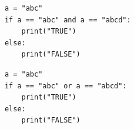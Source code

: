 \documentclass[dvipsnames, svgnames, x11names, handout]{beamer}
\begin{document}


\begin{frame}[fragile]{}
    \begin{center}
        \begin{verbatim}
            a = "abc"
            if a == "abc" and a == "abcd": 
                print("TRUE")
            else:
                print("FALSE")
        \end{verbatim}
    \end{center}
\end{frame}

\begin{frame}[fragile]{}
    \begin{center}
        \begin{verbatim}
            a = "abc"
            if a == "abc" or a == "abcd": 
                print("TRUE")
            else:
                print("FALSE")
        \end{verbatim}
    \end{center}
\end{frame}
\end{document}
